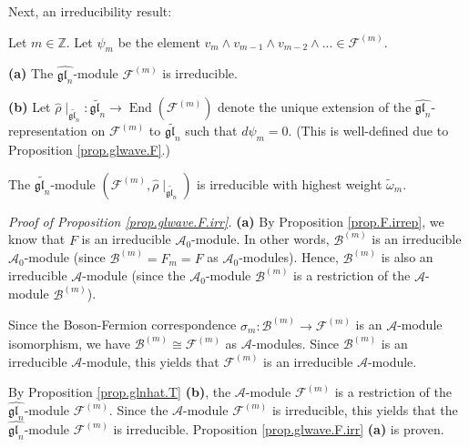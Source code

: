 \documentclass[etingof-lie.tex]{subfiles}
\begin{document}
Next, an irreducibility result:

\begin{proposition}
\label{prop.glwave.F.irr}Let $m\in\mathbb{Z}$. Let $\psi_{m}$ be the element
$v_{m}\wedge v_{m-1}\wedge v_{m-2}\wedge...\in\mathcal{F}^{\left(  m\right)
}$.

\textbf{(a)} The $\widehat{\mathfrak{gl}_{n}}$-module $\mathcal{F}^{\left(
m\right)  }$ is irreducible.

\textbf{(b)} Let $\widehat{\rho}\mid_{\widetilde{\mathfrak{gl}_{n}}%
}:\widetilde{\mathfrak{gl}_{n}}\rightarrow\operatorname*{End}\left(
\mathcal{F}^{\left(  m\right)  }\right)  $ denote the unique extension of the
$\widehat{\mathfrak{gl}_{n}}$-representation on $\mathcal{F}^{\left(
m\right)  }$ to $\widetilde{\mathfrak{gl}_{n}}$ such that $d\psi_{m}=0$. (This
is well-defined due to Proposition \ref{prop.glwave.F}.)

The $\widetilde{\mathfrak{gl}_{n}}$-module $\left(  \mathcal{F}^{\left(
m\right)  },\widehat{\rho}\mid_{\widetilde{\mathfrak{gl}_{n}}}\right)  $ is
irreducible with highest weight $\widetilde{\omega}_{m}$.
\end{proposition}

\textit{Proof of Proposition \ref{prop.glwave.F.irr}.} \textbf{(a)} By
Proposition \ref{prop.F.irrep}, we know that $F$ is an irreducible
$\mathcal{A}_{0}$-module. In other words, $\mathcal{B}^{\left(  m\right)  }$
is an irreducible $\mathcal{A}_{0}$-module (since $\mathcal{B}^{\left(
m\right)  }=F_{m}=F$ as $\mathcal{A}_{0}$-modules). Hence, $\mathcal{B}%
^{\left(  m\right)  }$ is also an irreducible $\mathcal{A}$-module (since the
$\mathcal{A}_{0}$-module $\mathcal{B}^{\left(  m\right)  }$ is a restriction
of the $\mathcal{A}$-module $\mathcal{B}^{\left(  m\right)  }$).

Since the Boson-Fermion correspondence $\sigma_{m}:\mathcal{B}^{\left(
m\right)  }\rightarrow\mathcal{F}^{\left(  m\right)  }$ is an $\mathcal{A}%
$-module isomorphism, we have $\mathcal{B}^{\left(  m\right)  }\cong%
\mathcal{F}^{\left(  m\right)  }$ as $\mathcal{A}$-modules. Since
$\mathcal{B}^{\left(  m\right)  }$ is an irreducible $\mathcal{A}$-module,
this yields that $\mathcal{F}^{\left(  m\right)  }$ is an irreducible
$\mathcal{A}$-module.

By Proposition \ref{prop.glnhat.T} \textbf{(b)}, the $\mathcal{A}$-module
$\mathcal{F}^{\left(  m\right)  }$ is a restriction of the
$\widehat{\mathfrak{gl}_{n}}$-module $\mathcal{F}^{\left(  m\right)  }$. Since
the $\mathcal{A}$-module $\mathcal{F}^{\left(  m\right)  }$ is irreducible,
this yields that the $\widehat{\mathfrak{gl}_{n}}$-module $\mathcal{F}%
^{\left(  m\right)  }$ is irreducible. Proposition \ref{prop.glwave.F.irr}
\textbf{(a)} is proven.
\end{document}
